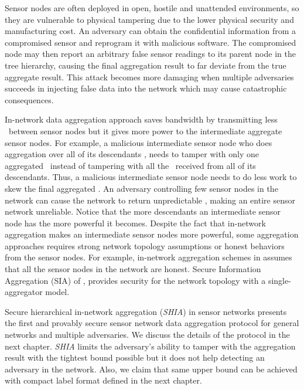 	Sensor nodes are often deployed in open, hostile and unattended environments, so they are vulnerable to physical tampering due to the lower physical security and manufacturing cost.
	An adversary can obtain the confidential information from a compromised sensor and reprogram it with malicious software.
	The compromised node may then report an arbitrary false sensor readings to its parent node in the tree hierarchy, causing the final aggregation result to far deviate from the true aggregate result.
	This attack becomes more damaging when multiple adversaries succeeds in injecting false data into the network which may cause catastrophic consequences.	

	In-network data aggregation approach saves bandwidth by transmitting less \payloads\  between sensor nodes but it gives more power to the intermediate aggregate sensor nodes. 
	For example, a malicious intermediate sensor node who does aggregation over all of its descendants \payloads, needs to tamper with only one aggregated \payload\ instead of tampering with all the \payloads\ received from all of its descendants. 
	Thus, a malicious intermediate sensor node needs to do less work to skew the final aggregated \payload.
	An adversary controlling few sensor nodes in the network can cause the network to return unpredictable \payloads, making an entire sensor network unreliable.
	Notice that the more descendants an intermediate sensor node has the more powerful it becomes.
	Despite the fact that in-network aggregation makes an intermediate sensor nodes more powerful, some aggregation approaches requires strong network topology assumptions or honest behaviors from the sensor nodes.
	For example, in-network aggregation schemes in \cite{yao2002cougar, madden2003design} assumes that all the sensor nodes in the network are honest. Secure Information Aggregation (SIA) of \cite{przydatek2003sia}, provides security for the network topology with a single-aggregator model.  

	Secure hierarchical in-network aggregation (\textit{SHIA}) in sensor networks \cite{chan2006secure} presents the first and provably secure sensor network data aggregation protocol for general networks and multiple adversaries. 
	We discuss the details of the protocol in the next chapter. 
	\textit{SHIA} limits the adversary's ability to tamper with the aggregation result with the tightest bound possible but it does not help detecting an adversary in the network.
	Also, we claim that same upper bound can be achieved with compact label format defined in the next chapter.
